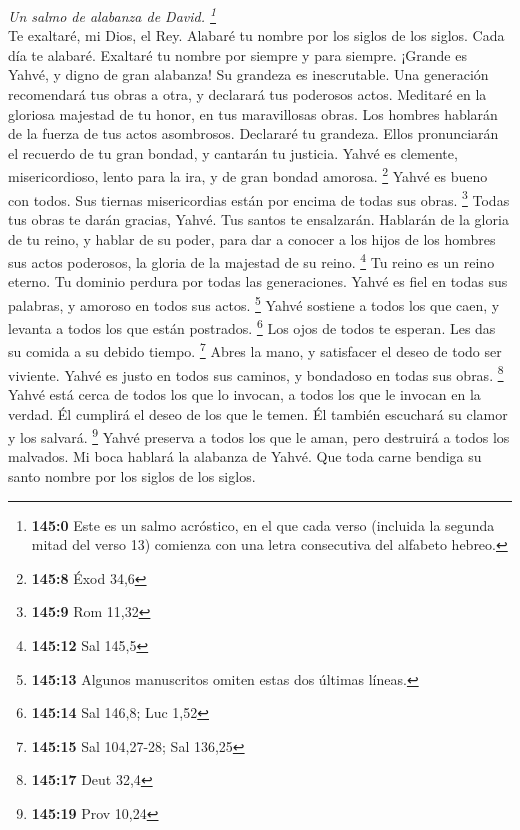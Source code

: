 \begin{paracol}{2}
\emph{Un salmo de alabanza de David. \footnote{\textbf{145:0} Este es un
  salmo acróstico, en el que cada verso (incluida la segunda mitad del
  verso 13) comienza con una letra consecutiva del alfabeto hebreo.}}\\
 Te exaltaré, mi Dios, el Rey. Alabaré tu nombre por los
siglos de los siglos.  Cada día te alabaré. Exaltaré tu
nombre por siempre y para siempre.  ¡Grande es Yahvé, y
digno de gran alabanza! Su grandeza es inescrutable.  Una
generación recomendará tus obras a otra, y declarará tus poderosos
actos.  Meditaré en la gloriosa majestad de tu honor, en
tus maravillosas obras.  Los hombres hablarán de la fuerza
de tus actos asombrosos. Declararé tu grandeza.  Ellos
pronunciarán el recuerdo de tu gran bondad, y cantarán tu justicia.
 Yahvé es clemente, misericordioso, lento para la ira, y
de gran bondad amorosa. \footnote{\textbf{145:8} Éxod 34,6}
 Yahvé es bueno con todos. Sus tiernas misericordias están
por encima de todas sus obras. \footnote{\textbf{145:9} Rom 11,32}
 Todas tus obras te darán gracias, Yahvé. Tus santos te
ensalzarán.  Hablarán de la gloria de tu reino, y hablar
de su poder,  para dar a conocer a los hijos de los
hombres sus actos poderosos, la gloria de la majestad de su reino.
\footnote{\textbf{145:12} Sal 145,5}  Tu reino es un
reino eterno. Tu dominio perdura por todas las generaciones. Yahvé es
fiel en todas sus palabras, y amoroso en todos sus actos. \footnote{\textbf{145:13}
  Algunos manuscritos omiten estas dos últimas líneas.} 
Yahvé sostiene a todos los que caen, y levanta a todos los que están
postrados. \footnote{\textbf{145:14} Sal 146,8; Luc 1,52}
 Los ojos de todos te esperan. Les das su comida a su
debido tiempo. \footnote{\textbf{145:15} Sal 104,27-28; Sal 136,25}
 Abres la mano, y satisfacer el deseo de todo ser
viviente.  Yahvé es justo en todos sus caminos, y
bondadoso en todas sus obras. \footnote{\textbf{145:17} Deut 32,4}
 Yahvé está cerca de todos los que lo invocan, a todos
los que le invocan en la verdad.  Él cumplirá el deseo de
los que le temen. Él también escuchará su clamor y los salvará.
\footnote{\textbf{145:19} Prov 10,24}  Yahvé preserva a
todos los que le aman, pero destruirá a todos los malvados.
 Mi boca hablará la alabanza de Yahvé. Que toda carne
bendiga su santo nombre por los siglos de los siglos.


\end{paracol}
